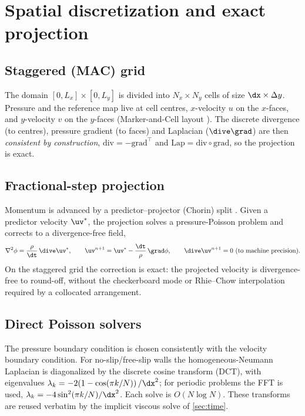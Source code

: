 \section{Spatial discretization and exact projection}
\label{sec:discretization}

\subsection{Staggered (MAC) grid}
The domain $[0,L_x]\times[0,L_y]$ is divided into $N_x\times N_y$ cells of size
$\dx\times\Delta y$. Pressure and the reference map live at cell centres,
$x$-velocity $u$ on the $x$-faces, and $y$-velocity $v$ on the $y$-faces
(Marker-and-Cell layout \cite{Harlow1965}). The discrete divergence (to centres),
pressure gradient (to faces) and Laplacian ($\dive\grad$) are then \emph{consistent by
construction}, $\mathrm{div}=-\mathrm{grad}^{\!\top}$ and
$\mathrm{Lap}=\mathrm{div}\circ\mathrm{grad}$, so the projection is exact.

\subsection{Fractional-step projection}
Momentum is advanced by a predictor--projector (Chorin) split \cite{Chorin1968}. Given a
predictor velocity $\uv^{*}$, the projection solves a pressure-Poisson problem and
corrects to a divergence-free field,
\begin{equation}
\nabla^2\phi = \frac{\rho}{\dt}\,\dive\uv^{*},
\qquad
\uv^{n+1}=\uv^{*}-\frac{\dt}{\rho}\,\grad\phi,
\qquad
\dive\uv^{n+1}=0\ \text{(to machine precision).}
\label{eq:project}
\end{equation}
On the staggered grid the correction is exact: the projected velocity is
divergence-free to round-off, without the checkerboard mode or Rhie--Chow interpolation
required by a collocated arrangement.

\subsection{Direct Poisson solvers}
The pressure boundary condition is chosen consistently with the velocity boundary
condition. For no-slip/free-slip walls the homogeneous-Neumann Laplacian is diagonalized
by the discrete cosine transform (DCT), with eigenvalues
$\lambda_{k}=-2\!\left(1-\cos(\pi k/N)\right)/\dx^2$; for periodic problems the FFT is
used, $\lambda_{k}=-4\sin^2(\pi k/N)/\dx^2$. Each solve is $O(N\log N)$. These
transforms are reused verbatim by the implicit viscous solve of \cref{sec:time}.

